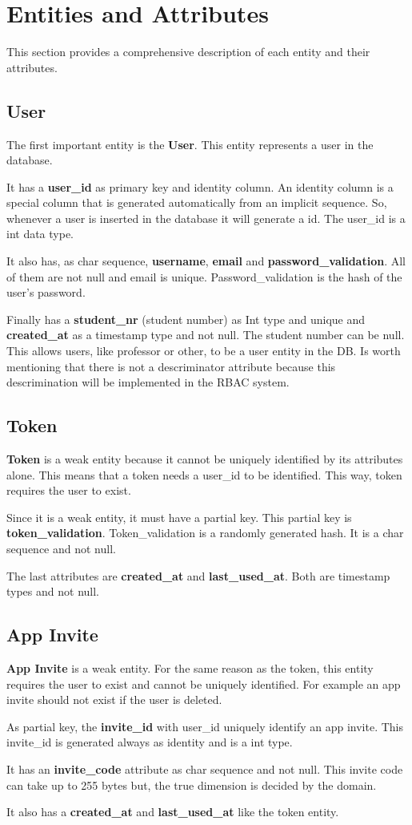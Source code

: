\documentclass[a4paper,twoside,11pt]{article}
\begin{document}
\section*{Entities and Attributes}
This section provides a comprehensive description of each entity and their attributes.
\subsection*{User}
The first important entity is the \textbf{User}. This entity represents a user in the database.

It has a \textbf{user\_id} as primary key and identity column. An identity column is a special column that is generated automatically from an implicit sequence.
So, whenever a user is inserted in the database it will generate a id. The user\_id is a int data type. 

It also has, as char sequence, \textbf{username}, \textbf{email} and \textbf{password\_validation}. All of them are not null and email is unique. Password\_validation is the hash of the user's password.

Finally has a \textbf{student\_nr} (student number) as Int type and unique and \textbf{created\_at} as a timestamp type and not null.
The student number can be null. This allows users, like professor or other, to be a user entity in the DB. Is worth mentioning that there is not a descriminator attribute because 
this descrimination will be implemented in the RBAC system.

\subsection*{Token}
\textbf{Token} is a weak entity because it cannot be uniquely identified by its attributes alone. This means that a token needs a user\_id to be identified. This way, token requires the user to exist.

Since it is a weak entity, it must have a partial key. This partial key is \textbf{token\_validation}. Token\_validation is a randomly generated hash. It is a char sequence and not null.

The last attributes are \textbf{created\_at} and \textbf{last\_used\_at}. Both are timestamp types and not null. 

\subsection*{App Invite}
\textbf{App Invite} is a weak entity. For the same reason as the token, this entity requires the user to exist and cannot be uniquely identified. For example an app invite should not exist if the user is deleted.

As partial key, the \textbf{invite\_id} with user\_id uniquely identify an app invite. This invite\_id is generated always as identity and is a int type.

It has an \textbf{invite\_code} attribute as char sequence and not null. This invite code can take up to 255 bytes but, the true dimension is decided by the domain.

It also has a \textbf{created\_at} and \textbf{last\_used\_at} like the token entity.

\nocite{*}


\end{document}
